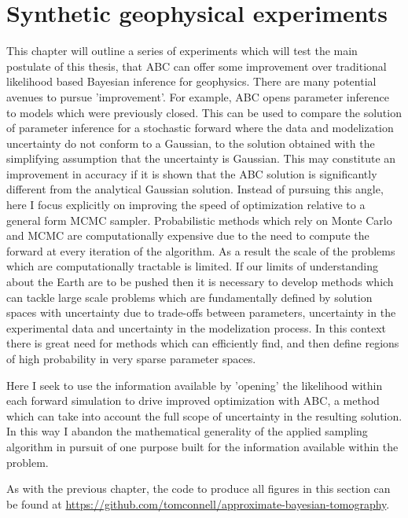 \chapter{Synthetic geophysical experiments}

This chapter will outline a series of experiments which will test the main postulate of this thesis, that ABC can offer some improvement over traditional likelihood based Bayesian inference for geophysics. There are many potential avenues to pursue 'improvement'. For example, ABC opens parameter inference to models which were previously closed. This can be used to compare the solution of parameter inference for a stochastic forward where the data and modelization uncertainty do not conform to a Gaussian, to the solution obtained with the simplifying assumption that the uncertainty is Gaussian. This may constitute an improvement in accuracy if it is shown that the ABC solution is significantly different from the analytical Gaussian solution. Instead of pursuing this angle, here I focus explicitly on improving the speed of optimization relative to a general form MCMC sampler. Probabilistic methods which rely on Monte Carlo and MCMC are computationally expensive due to the need to compute the forward at every iteration of the algorithm. As a result the scale of the problems which are computationally tractable is limited. If our limits of understanding about the Earth are to be pushed then it is necessary to develop methods which can tackle large scale problems which are fundamentally defined by solution spaces with uncertainty due to trade-offs between parameters, uncertainty in the experimental data and uncertainty in the modelization process. In this context there is great need for methods which can efficiently find, and then define regions of high probability in very sparse parameter spaces. \par

Here I seek to use the information available by 'opening' the likelihood within each forward simulation to drive improved optimization with ABC, a method which can take into account the full scope of uncertainty in the resulting solution. In this way I abandon the mathematical generality of the applied sampling algorithm in pursuit of one purpose built for the information available within the problem. \par

As with the previous chapter, the code to produce all figures in this section can be found at \url{https://github.com/tomconnell/approximate-bayesian-tomography}.\par


